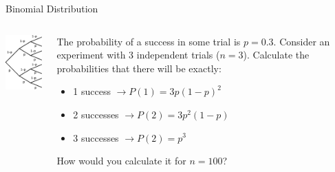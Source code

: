 \begin{frame}{Binomial Distribution}

    \begin{columns}
    \begin{column}{0.25\textwidth}
        \includegraphics[width=\linewidth]{gfx/probability_tree}
    \end{column}
    \begin{column}{0.75\textwidth}
        \begin{example}
            \medskip
            The probability of a success in some trial is $p=0.3$. Consider an experiment with 3 independent trials ($n=3$). Calculate the probabilities that there will be exactly:
            \begin{itemize}
                \item 1 success $\rightarrow P(1) = 3p(1-p)^2$
                \item 2 successes $\rightarrow P(2) = 3p^2(1-p)$
                \item 3 successes $\rightarrow P(2) = p^3$
            \end{itemize}
            How would you calculate it for $n=100$?
        \end{example}
    \end{column}
    \end{columns}

\end{frame}

